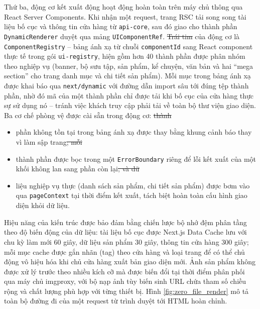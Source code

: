\documentclass[../main.tex]{subfiles}
\providecommand{\DIFadd}[1]{{\protect\color{blue}\uwave{#1}}} %
\providecommand{\DIFdel}[1]{{\protect\color{red}\sout{#1}}} %
\providecommand{\DIFaddbegin}{} %
\providecommand{\DIFaddend}{} %
\providecommand{\DIFdelbegin}{} %
\providecommand{\DIFdelend}{} %
\begin{document}
Thứ ba, động cơ kết xuất động hoạt động hoàn toàn trên máy chủ thông qua React Server Components. Khi nhận một request, trang RSC tải song song tài liệu bố cục và thông tin cửa hàng từ \texttt{api-core}, sau đó giao cho thành phần \texttt{DynamicRenderer} duyệt qua mảng \texttt{UIComponentRef}. \DIFdelbegin \DIFdel{Trái tim }\DIFdelend \DIFaddbegin \DIFadd{Thành phần cốt lõi }\DIFaddend của động cơ là \texttt{ComponentRegistry} -- bảng ánh xạ từ chuỗi \texttt{componentId} sang React component thực tế trong gói \texttt{ui-registry}, hiện gồm hơn 40 thành phần được phân nhóm theo nghiệp vụ (banner, bộ sưu tập, sản phẩm, kể chuyện, văn bản và hai ``mega section'' cho trang danh mục và chi tiết sản phẩm). Mỗi mục trong bảng ánh xạ được khai báo qua \texttt{next/dynamic} với đường dẫn import sâu tới đúng tệp thành phần, nhờ đó mã của một thành phần chỉ được tải khi bố cục của cửa hàng thực sự sử dụng nó -- tránh việc khách truy cập phải tải về toàn bộ thư viện giao diện. Ba cơ chế phòng vệ được cài sẵn trong động cơ:
\DIFdelbegin \DIFdel{thành }\DIFdelend \DIFaddbegin 

\begin{itemize}
    \item \DIFadd{Thành }\DIFaddend phần không tồn tại trong bảng ánh xạ được thay bằng khung cảnh báo thay vì làm sập trang\DIFdelbegin \DIFdel{; mỗi }\DIFdelend \DIFaddbegin \DIFadd{.
    }\item \DIFadd{Mỗi }\DIFaddend thành phần được bọc trong một \texttt{ErrorBoundary} riêng để lỗi kết xuất của một khối không lan sang phần còn lại\DIFdelbegin \DIFdel{; và dữ }\DIFdelend \DIFaddbegin \DIFadd{.
    }\item \DIFadd{Dữ }\DIFaddend liệu nghiệp vụ thực (danh sách sản phẩm, chi tiết sản phẩm) được bơm vào qua \texttt{pageContext} tại thời điểm kết xuất, tách biệt hoàn toàn cấu hình giao diện khỏi dữ liệu.
\DIFaddbegin \end{itemize}
\DIFaddend 

Hiệu năng của kiến trúc được bảo đảm bằng chiến lược bộ nhớ đệm phân tầng theo độ biến động của dữ liệu: tài liệu bố cục được Next.js Data Cache lưu với chu kỳ làm mới 60 giây, dữ liệu sản phẩm 30 giây, thông tin cửa hàng 300 giây; mỗi mục cache được gắn nhãn (tag) theo cửa hàng và loại trang để có thể chủ động vô hiệu hóa khi chủ cửa hàng xuất bản giao diện mới. Ảnh sản phẩm không được xử lý trước theo nhiều kích cỡ mà được biến đổi tại thời điểm phân phối qua máy chủ imgproxy, với bộ nạp ảnh tùy biến sinh URL chứa tham số chiều rộng và chất lượng phù hợp với từng thiết bị. Hình \ref{fig:zero_file_render} mô tả toàn bộ đường đi của một request từ trình duyệt tới HTML hoàn chỉnh.
\end{document}

